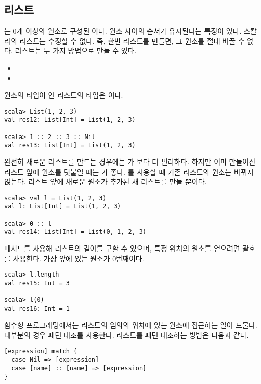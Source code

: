 \subsection{리스트}

는 0개 이상의 원소로 구성된 이다. 원소 사이의
순서가 유지된다는 특징이 있다. 스칼라의 리스트는 수정할 수 없다. 즉, 한번 리스트를
만들면, 그 원소를 절대 바꿀 수 없다. 리스트는 두 가지 방법으로 만들 수 있다.

\begin{itemize}
  \item {}
  \item {}
\end{itemize}

원소의 타입이 인 리스트의 타입은 이다.

\begin{verbatim}
scala> List(1, 2, 3)
val res12: List[Int] = List(1, 2, 3)

scala> 1 :: 2 :: 3 :: Nil
val res13: List[Int] = List(1, 2, 3)
\end{verbatim}

완전히 새로운 리스트를 만드는 경우에는 가 \code{::}보다 더 편리하다. 하지만
이미 만들어진 리스트 앞에 원소를 덧붙일 때는 \code{::}가 좋다.
\code{::}를 사용할 때 기존 리스트의 원소는 바뀌지 않는다.
리스트 앞에 새로운 원소가 추가된 새 리스트를 만들 뿐이다.

\begin{verbatim}
scala> val l = List(1, 2, 3)
val l: List[Int] = List(1, 2, 3)

scala> 0 :: l
val res14: List[Int] = List(0, 1, 2, 3)
\end{verbatim}

 메서드를 사용해 리스트의 길이를 구할 수 있으며, 특정 위치의 원소를
얻으려면 괄호를 사용한다. 가장 앞에 있는 원소가 0번째이다.

\begin{verbatim}
scala> l.length
val res15: Int = 3

scala> l(0)
val res16: Int = 1
\end{verbatim}

함수형 프로그래밍에서는 리스트의 임의의 위치에 있는 원소에 접근하는 일이 드물다.
대부분의 경우 패턴 대조를 사용한다. 리스트를 패턴 대조하는 방법은 다음과 같다.

\begin{verbatim}
[expression] match {
  case Nil => [expression]
  case [name] :: [name] => [expression]
}
\end{verbatim}

